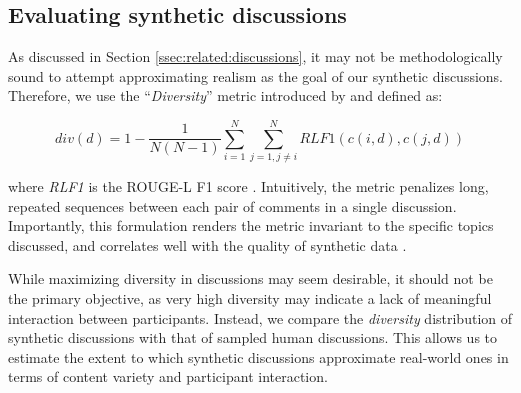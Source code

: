 \subsection{Evaluating synthetic discussions}
\label{ssec:methodology:diversity}

As discussed in Section \ref{ssec:related:discussions}, it may not be methodologically sound to attempt approximating realism as the goal of our synthetic discussions. Therefore, we use the “\textit{Diversity}” metric introduced by \citet{ulmer2024} and defined as:

\small
\begin{equation}
\label{eq:variety}
    div(d) = 1- \frac{1}{N(N-1)} \sum_{i=1}^N \sum_{j=1, j \neq i}^N \textit{RLF1}(c(i, d), c(j, d))
\end{equation}
\normalsize

\noindent where \textit{RLF1} is the ROUGE-L F1 score \cite{lin-2004-rouge}. Intuitively, the metric penalizes long, repeated sequences between each pair of comments in a single discussion.  Importantly, this formulation renders the metric invariant to the specific topics discussed, and correlates well with the quality of synthetic data \cite{ulmer2024}.

While maximizing diversity in discussions may seem desirable, it should not be the primary objective, as very high diversity may indicate a lack of meaningful interaction between participants. Instead, we compare the \textit{diversity} distribution of synthetic discussions with that of sampled human discussions. This allows us to estimate the extent to which synthetic discussions approximate real-world ones in terms of content variety and participant interaction. 